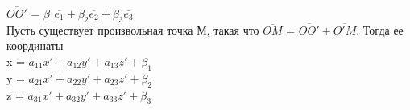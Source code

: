 $\overline{OO'}$ = $\beta_1\overline{e_1} + \beta_2\overline{e_2} + \beta_3\overline{e_3}$ \\

Пусть существует произвольная точка М, такая что $\overline{OM}$ = $\overline{OO'} + \overline{O'M}$. Тогда ее координаты\\

x = $a_{11}x' + a_{12}y' + a_{13}z' + \beta_1$\\
y = $a_{21}x' + a_{22}y' + a_{23}z' + \beta_2$\\
z = $a_{31}x' + a_{32}y' + a_{33}z' + \beta_3$\\
